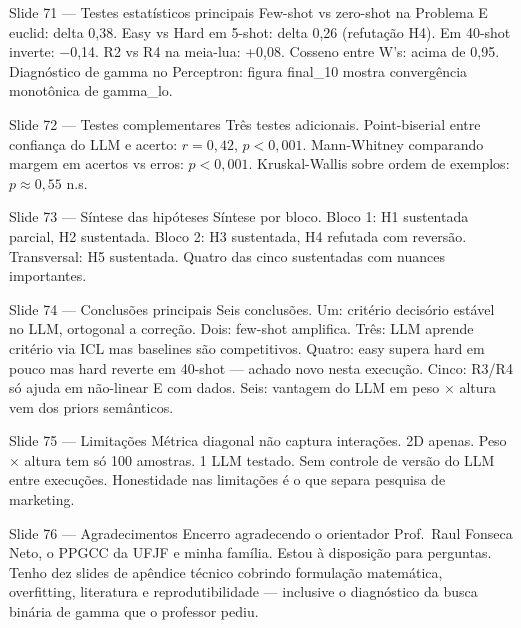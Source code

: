 \documentclass[aspectratio=169,10pt]{beamer}
\begin{document}
\begin{frame}{Slide 71 --- Testes estat\'isticos principais}
\footnotesize
Few-shot vs zero-shot na Problema E euclid: delta 0{,}38. Easy vs Hard em 5-shot: delta 0{,}26 (refuta\c{c}\~ao H4). Em 40-shot inverte: $-$0{,}14. R2 vs R4 na meia-lua: +0{,}08. Cosseno entre W's: acima de 0{,}95. Diagn\'ostico de gamma no Perceptron: figura final\_10 mostra converg\^encia monot\^onica de gamma\_lo.
\end{frame}

\begin{frame}{Slide 72 --- Testes complementares}
\footnotesize
Tr\^es testes adicionais. Point-biserial entre confian\c{c}a do LLM e acerto: $r = 0{,}42$, $p<0{,}001$. Mann-Whitney comparando margem em acertos vs erros: $p<0{,}001$. Kruskal-Wallis sobre ordem de exemplos: $p \approx 0{,}55$ n.s.
\end{frame}

\begin{frame}{Slide 73 --- S\'intese das hip\'oteses}
\footnotesize
S\'intese por bloco. Bloco 1: H1 sustentada parcial, H2 sustentada. Bloco 2: H3 sustentada, H4 refutada com revers\~ao. Transversal: H5 sustentada. Quatro das cinco sustentadas com nuances importantes.
\end{frame}

\begin{frame}{Slide 74 --- Conclus\~oes principais}
\footnotesize
Seis conclus\~oes. Um: crit\'erio decis\'orio est\'avel no LLM, ortogonal a corre\c{c}\~ao. Dois: few-shot amplifica. Tr\^es: LLM aprende crit\'erio via ICL mas baselines s\~ao competitivos. Quatro: easy supera hard em pouco mas hard reverte em 40-shot --- achado novo nesta execu\c{c}\~ao. Cinco: R3/R4 s\'o ajuda em n\~ao-linear E com dados. Seis: vantagem do LLM em peso $\times$ altura vem dos priors sem\^anticos.
\end{frame}

\begin{frame}{Slide 75 --- Limita\c{c}\~oes}
\footnotesize
M\'etrica diagonal n\~ao captura intera\c{c}\~oes. 2D apenas. Peso $\times$ altura tem s\'o 100 amostras. 1 LLM testado. Sem controle de vers\~ao do LLM entre execu\c{c}\~oes. Honestidade nas limita\c{c}\~oes \'e o que separa pesquisa de marketing.
\end{frame}

\begin{frame}{Slide 76 --- Agradecimentos}
\footnotesize
Encerro agradecendo o orientador Prof.\ Raul Fonseca Neto, o PPGCC da UFJF e minha fam\'ilia. Estou \`a disposi\c{c}\~ao para perguntas. Tenho dez slides de ap\^endice t\'ecnico cobrindo formula\c{c}\~ao matem\'atica, overfitting, literatura e reprodutibilidade --- inclusive o diagn\'ostico da busca bin\'aria de gamma que o professor pediu.
\end{frame}
\end{document}
